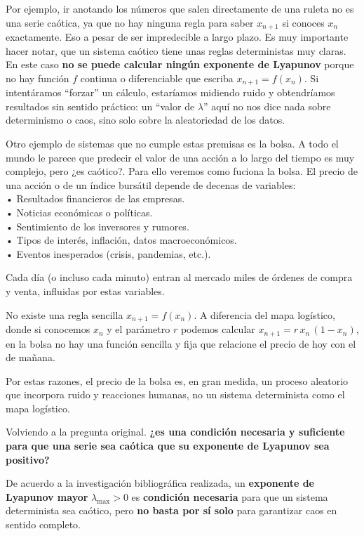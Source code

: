 \documentclass[
  11pt,
  a4paper,
  DIV=11,
  numbers=noendperiod]{scrreprt}
\begin{document}
Por ejemplo, ir anotando los números que salen directamente de una
ruleta no es una serie caótica, ya que no hay ninguna regla para saber
\(x_{n+1}\) si conoces \(x_n\) exactamente. Eso a pesar de ser
impredecible a largo plazo. Es muy importante hacer notar, que un
sistema caótico tiene unas reglas deterministas muy claras. En este caso
\textbf{no se puede calcular ningún exponente de Lyapunov} porque no hay
función \(f\) continua o diferenciable que escriba \(x_{n+1} = f(x_n)\).
Si intentáramos ``forzar'' un cálculo, estaríamos midiendo ruido y
obtendríamos resultados sin sentido práctico: un ``valor de
\(\lambda\)'' aquí no nos dice nada sobre determinismo o caos, sino solo
sobre la aleatoriedad de los datos.

Otro ejemplo de sistemas que no cumple estas premisas es la bolsa. A
todo el mundo le parece que predecir el valor de una acción a lo largo
del tiempo es muy complejo, pero ¿es caótico?. Para ello veremos como
fuciona la bolsa. El precio de una acción o de un índice bursátil
depende de decenas de variables:\\
• Resultados financieros de las empresas.\\
• Noticias económicas o políticas.\\
• Sentimiento de los inversores y rumores.\\
• Tipos de interés, inflación, datos macroeconómicos.\\
• Eventos inesperados (crisis, pandemias, etc.).

Cada día (o incluso cada minuto) entran al mercado miles de órdenes de
compra y venta, influidas por estas variables.

No existe una regla sencilla \(x_{n+1} = f(x_n)\). A diferencia del mapa
logístico, donde si conocemos \(x_n\) y el parámetro \(r\) podemos
calcular \(x_{n+1} = r\,x_n\,(1 - x_n)\), en la bolsa no hay una función
sencilla y fija que relacione el precio de hoy con el de mañana.

Por estas razones, el precio de la bolsa es, en gran medida, un proceso
aleatorio que incorpora ruido y reacciones humanas, no un sistema
determinista como el mapa logístico.

Volviendo a la pregunta original. \textbf{¿es una condición necesaria y
suficiente para que una serie sea caótica que su exponente de Lyapunov
sea positivo?}

De acuerdo a la investigación bibliográfica realizada, un
\textbf{exponente de Lyapunov mayor} \(\lambda_{\max} > 0\) es
\textbf{condición necesaria} para que un sistema determinista sea
caótico, pero \textbf{no basta por sí solo} para garantizar caos en
sentido completo.
\end{document}
